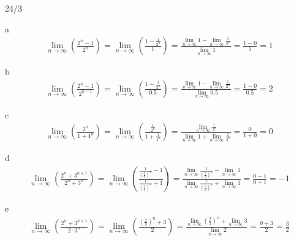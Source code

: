 \begin{exercise}{24/3}
  \item [a]
  \begin{gather*}
    \lim\limits_{n \to \infty} (\frac{2^n - 1}{2^n}) = \lim\limits_{n \to \infty} (\frac{1 - \frac{1}{2^n}}{1}) = \frac{\lim\limits_{n \to \infty} 1 - \lim\limits_{n \to \infty} \frac{1}{2^n}}{\lim\limits_{n \to \infty} 1} = \frac{1 - 0}{1} = 1
  \end{gather*}
  \item [b]
  \begin{gather*}
    \lim\limits_{n \to \infty} (\frac{2^n - 1}{2^{n - 1}}) = \lim\limits_{n \to \infty} (\frac{1 - \frac{1}{2^n}}{0.5}) = \frac{\lim\limits_{n \to \infty} 1 - \lim\limits_{n \to \infty} \frac{1}{2^n}}{\lim\limits_{n \to \infty} 0.5} = \frac{1 - 0}{0.5} = 2
  \end{gather*}
  \item [c]
  \begin{gather*}
    \lim\limits_{n \to \infty} (\frac{2^n}{1 + 4^n}) = \lim\limits_{n \to \infty} (\frac{\frac{1}{2^n}}{1 + \frac{1}{4^n}}) = \frac{\lim\limits_{n \to \infty} \frac{1}{2^n}}{\lim\limits_{n \to \infty} 1 + \lim\limits_{n \to \infty} \frac{1}{4^n}}= \frac{0}{1 + 0} = 0
  \end{gather*}
  \item [d]
  \begin{gather*}
    \lim\limits_{n \to \infty} (\frac{2^n + 3^{n+1}}{2^n + 3^n}) = \lim\limits_{n \to \infty} (\frac{\frac{1}{(\frac{3}{2})^n} - 1}{\frac{1}{(\frac{3}{2})^n} + 1}) = \frac{ \lim\limits_{n \to \infty}\frac{1}{(\frac{3}{2})^n} - \lim\limits_{n \to \infty} 1}{\lim\limits_{n \to \infty} \frac{1}{(\frac{3}{2})^n} + \lim\limits_{n \to \infty} 1} = \frac{0 - 1}{0 + 1} = -1
  \end{gather*}
  \item [e]
  \begin{gather*}
    \lim\limits_{n \to \infty} (\frac{2^n + 3^{n + 1}}{2 \cdot 3^n}) = \lim\limits_{n \to \infty} (\frac{(\frac{2}{3})^n + 3}{2}) = \frac{\lim\limits_{n \to \infty} (\frac{2}{3})^n + \lim\limits_{n \to \infty} 3}{\lim\limits_{n \to \infty} 2} = \frac{0 + 3}{2} = \frac{3}{2}
  \end{gather*}
\end{exercise}
